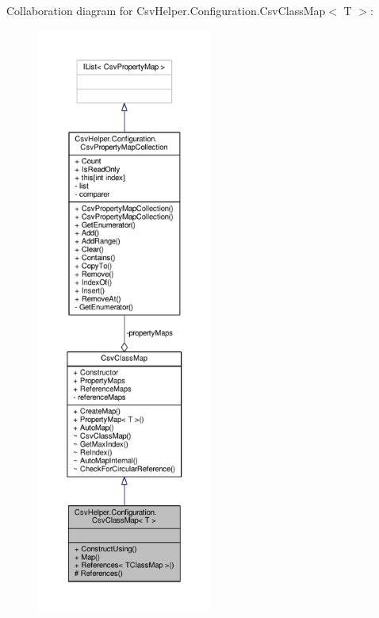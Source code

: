 Collaboration diagram for Csv\-Helper.\-Configuration.\-Csv\-Class\-Map$<$ T $>$\-:
\nopagebreak
\begin{figure}[H]
\begin{center}
\leavevmode
\includegraphics[height=550pt]{dd/dea/a00408}
\end{center}
\end{figure}
